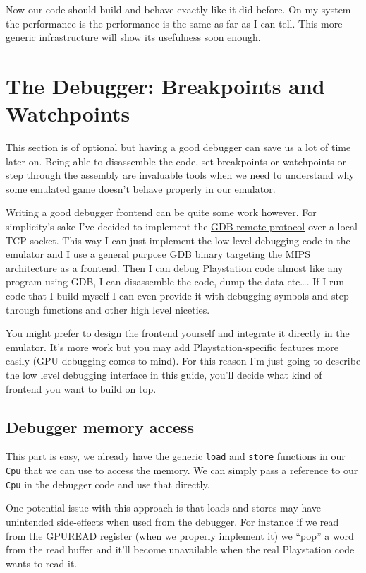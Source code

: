\documentclass[a4paper]{article}
\newcommand{\code}[1] {\texttt{#1}}
\begin{document}
Now our code should build and behave exactly like it did before. On my
system the performance is the performance is the same as far as I can
tell. This more generic infrastructure will show its usefulness soon
enough.

\section{The Debugger: Breakpoints and Watchpoints}

This section is of optional but having a good debugger can save us a
lot of time later on. Being able to disassemble the code, set
breakpoints or watchpoints or step through the assembly are invaluable
tools when we need to understand why some emulated game doesn't behave
properly in our emulator.

Writing a good debugger frontend can be quite some work however. For
simplicity's sake I've decided to implement the \href{XXXX}{GDB remote
  protocol} over a local TCP socket. This way I can just implement the
low level debugging code in the emulator and I use a general purpose
GDB binary targeting the MIPS architecture as a frontend. Then I can
debug Playstation code almost like any program using GDB, I can
disassemble the code, dump the data etc\dots{}. If I run code that I
build myself I can even provide it with debugging symbols and step
through functions and other high level niceties.

You might prefer to design the frontend yourself and integrate it
directly in the emulator. It's more work but you may add
Playstation-specific features more easily (GPU debugging comes to
mind). For this reason I'm just going to describe the low level
debugging interface in this guide, you'll decide what kind of frontend
you want to build on top.

\subsection{Debugger memory access}

\label{sec:debug-mem-access}

This part is easy, we already have the generic \code{load} and
\code{store} functions in our \code{Cpu} that we can use to access the
memory. We can simply pass a reference to our \code{Cpu} in the
debugger code and use that directly.

One potential issue with this approach is that loads and stores may
have unintended side-effects when used from the debugger. For instance
if we read from the GPUREAD register (when we properly implement it)
we ``pop'' a word from the read buffer and it'll become unavailable
when the real Playstation code wants to read it.
\end{document}
